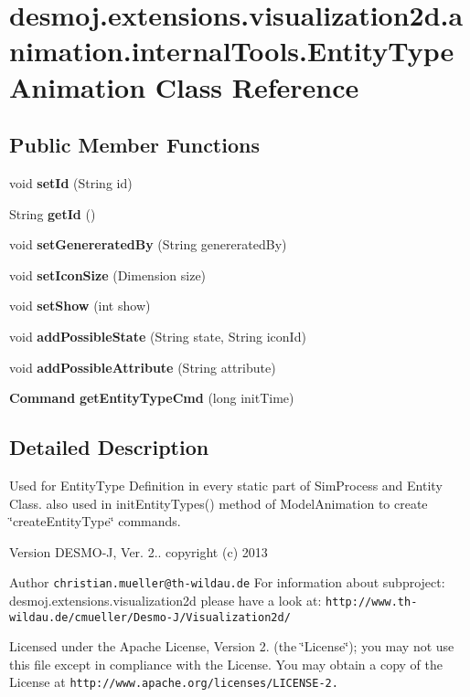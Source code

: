 \section{desmoj.\-extensions.\-visualization2d.\-animation.\-internal\-Tools.\-Entity\-Type\-Animation Class Reference}
\label{classdesmoj_1_1extensions_1_1visualization2d_1_1animation_1_1internal_tools_1_1_entity_type_animation}
\subsection*{Public Member Functions}
\begin{DoxyCompactItemize}
\item 
void {\bf set\-Id} (String id)
\item 
String {\bfseries get\-Id} ()\label{classdesmoj_1_1extensions_1_1visualization2d_1_1animation_1_1internal_tools_1_1_entity_type_animation_a25d44957dc1ce62c14b0621e4adca58f}

\item 
void {\bf set\-Genererated\-By} (String genererated\-By)
\item 
void {\bf set\-Icon\-Size} (Dimension size)
\item 
void {\bf set\-Show} (int show)
\item 
void {\bf add\-Possible\-State} (String state, String icon\-Id)
\item 
void {\bf add\-Possible\-Attribute} (String attribute)
\item 
{\bf Command} {\bf get\-Entity\-Type\-Cmd} (long init\-Time)
\end{DoxyCompactItemize}


\subsection{Detailed Description}
Used for Entity\-Type Definition in every static part of Sim\-Process and Entity Class. also used in init\-Entity\-Types() method of Model\-Animation to create \char`\"{}create\-Entity\-Type\char`\"{} commands.

\begin{DoxyVersion}{Version}
D\-E\-S\-M\-O-\/\-J, Ver. 2.. copyright (c) 2013 
\end{DoxyVersion}
\begin{DoxyAuthor}{Author}
{\tt christian.\-mueller@th-\/wildau.\-de} For information about subproject\-: desmoj.\-extensions.\-visualization2d please have a look at\-: {\tt http\-://www.\-th-\/wildau.\-de/cmueller/\-Desmo-\/\-J/\-Visualization2d/}
\end{DoxyAuthor}
Licensed under the Apache License, Version 2. (the \char`\"{}\-License\char`\"{}); you may not use this file except in compliance with the License. You may obtain a copy of the License at {\tt http\-://www.\-apache.\-org/licenses/\-L\-I\-C\-E\-N\-S\-E-\/2.}

